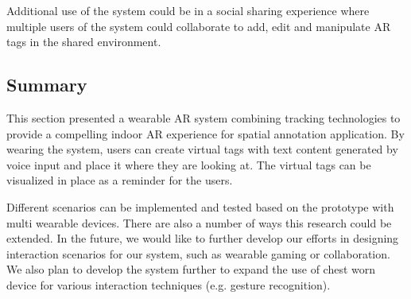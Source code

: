 Additional use of the system could be in a social sharing experience where multiple users of the system could collaborate to add, edit and manipulate AR tags in the shared environment. 
%
%

\subsection{Summary}

This section presented a wearable AR system combining tracking technologies to provide a compelling indoor AR experience for spatial annotation application. By wearing the system, users can create virtual tags with text content generated by voice input and place it where they are looking at. The virtual tags can be visualized in place as a reminder for the users.  

Different scenarios can be implemented and tested based on the prototype with multi wearable devices. There are also a number of ways this research could be extended. In the future, we would like to further develop our efforts in designing interaction scenarios for our system, such as wearable gaming or collaboration. We also plan to develop the system further to expand the use of chest worn device for various interaction techniques (e.g. gesture recognition).
